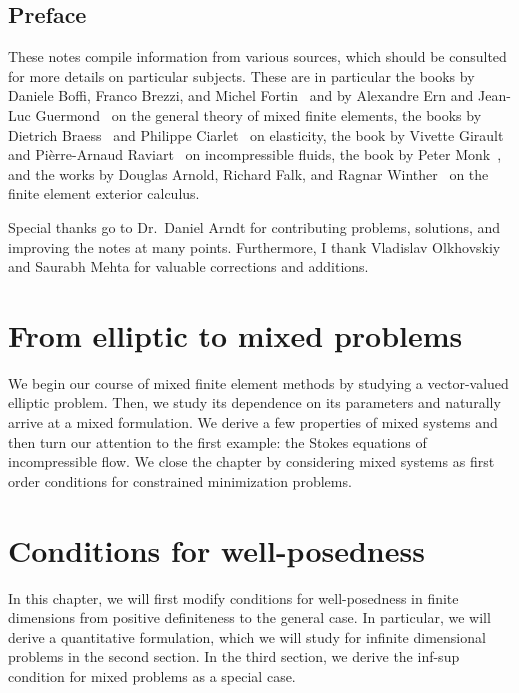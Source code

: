 
\maketitle

\section*{Preface}
%

These notes compile information from various sources, which should be
consulted for more details on particular subjects. These are in
particular the books by Daniele Boffi, Franco Brezzi, and Michel
Fortin~\cite{BoffiBrezziFortin13} and by Alexandre Ern and Jean-Luc
Guermond~\cite{ErnGuermond04} on the general theory of mixed finite
elements, the books by Dietrich Braess~\cite{Braess97,Braess13} and
Philippe Ciarlet~\cite{Ciarlet88} on elasticity, the book by Vivette
Girault and Pièrre-Arnaud Raviart~\cite{GiraultRaviart86} on
incompressible fluids, the book by Peter Monk~\cite{Monk03}, and the
works by Douglas Arnold, Richard Falk, and Ragnar
Winther~\cite{ArnoldFalkWinther06acta,ArnoldFalkWinther10} on the
finite element exterior calculus.

Special thanks go to Dr.~Daniel Arndt for contributing problems,
solutions, and improving the notes at many points. Furthermore, I
thank Vladislav Olkhovskiy and Saurabh Mehta for valuable corrections
and additions.
\thispagestyle{empty}
\setcounter{page}{0}


\tableofcontents

\chapter{From elliptic to mixed problems}
We begin our course of mixed finite element methods by studying a
vector-valued elliptic problem. Then, we study its dependence on its
parameters and naturally arrive at a mixed formulation. We derive a
few properties of mixed systems and then turn our attention to the
first example: the Stokes equations of incompressible flow. We close
the chapter by considering mixed systems as first order conditions
for constrained minimization problems.




\chapter{Conditions for well-posedness}
\label{sec:mixed-wellposedness}
In this chapter, we will first modify conditions for well-posedness in
finite dimensions from positive definiteness to the general case. In
particular, we will derive a quantitative formulation, which we will
study for infinite dimensional problems in the second section. In the
third section, we derive the inf-sup condition for mixed problems as a
special case.


